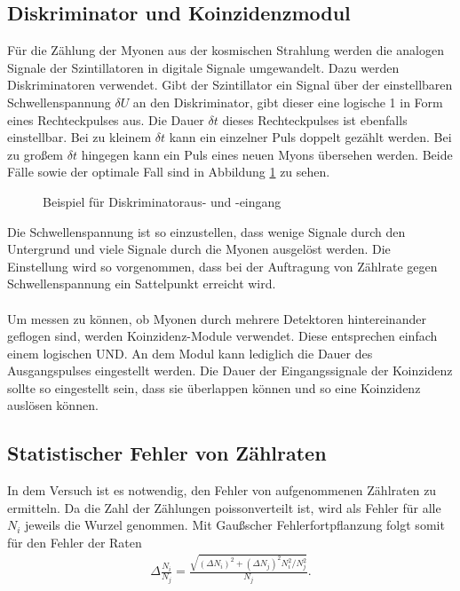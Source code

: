 \newpage

\subsection{Diskriminator und Koinzidenzmodul}
Für die Zählung der Myonen aus der kosmischen Strahlung werden die analogen Signale der Szintillatoren in digitale Signale umgewandelt. Dazu werden Diskriminatoren verwendet. Gibt der Szintillator ein Signal über der einstellbaren Schwellenspannung $\delta U$ an den Diskriminator, gibt dieser eine logische 1 in Form eines Rechteckpulses aus. Die Dauer $\delta t$ dieses Rechteckpulses ist ebenfalls einstellbar. Bei zu kleinem $\delta t$ kann ein einzelner Puls doppelt gezählt werden. Bei zu großem $\delta t$ hingegen kann ein Puls eines neuen Myons übersehen werden. Beide Fälle sowie der optimale Fall sind in Abbildung \ref{fig:diskriminator} zu sehen.

\begin{figure}[h]
  \centering
  \caption{Beispiel für Diskriminatoraus- und -eingang}
  \label{fig:diskriminator}
\end{figure}

Die Schwellenspannung ist so einzustellen, dass wenige Signale durch den Untergrund und viele Signale durch die Myonen ausgelöst werden. Die Einstellung wird so vorgenommen, dass bei der Auftragung von Zählrate gegen Schwellenspannung ein Sattelpunkt erreicht wird. \\ \\
Um messen zu können, ob Myonen durch mehrere Detektoren hintereinander geflogen sind, werden Koinzidenz-Module verwendet. Diese entsprechen einfach einem logischen UND. An dem Modul kann lediglich die Dauer des Ausgangspulses eingestellt werden. Die Dauer der Eingangssignale der Koinzidenz sollte so eingestellt sein, dass sie überlappen können und so eine Koinzidenz auslösen können.

\subsection{Statistischer Fehler von Zählraten}
In dem Versuch ist es notwendig, den Fehler von aufgenommenen Zählraten zu ermitteln. Da die Zahl der Zählungen poissonverteilt ist, wird als Fehler für alle $N_i$ jeweils die Wurzel genommen. Mit Gaußscher Fehlerfortpflanzung folgt somit für den Fehler der Raten 
\begin{align}
  \Delta \frac{N_i}{N_j}=\frac{\sqrt{(\Delta N_i)^2+(\Delta N_j)^2N_i^2/N_j^2}}{N_j}.
  \label{eq:error}
\end{align}
